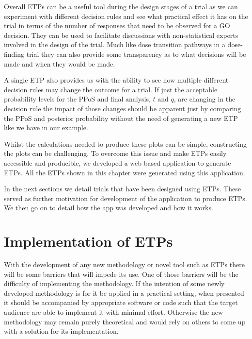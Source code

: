Overall ETPs can be a useful tool during the design stages of a trial as we can experiment with different decision rules and see what practical effect it has on the trial in terms of the number of responses that need to be observed for a GO decision. They can be used to facilitate discussions with non-statistical experts involved in the design of the trial. Much like dose transition pathways in a dose-finding trial they can also provide some transparency as to what decisions will be made and when they would be made. 

A single ETP also provides us with the ability to see how multiple different decision rules may change the outcome for a trial. If just the acceptable probability levels for the PPoS and final analysis, $t$ and $q$, are changing in the decision rule the impact of those changes should be apparent just by comparing the PPoS and posterior probability without the need of generating a new ETP like we have in our example.

Whilst the calculations needed to produce these plots can be simple, constructing the plots can be challenging. To overcome this issue and make ETPs easily accessible and producible, we developed a web based application to generate ETPs. All the ETPs shown in this chapter were generated using this application. 

In the next sections we detail trials that have been designed using ETPs. These served as further motivation for development of the application to produce ETPs. We then go on to detail how the app was developed and how it works.    


\section{Implementation of ETPs}

With the development of any new methodology or novel tool such as ETPs there will be some barriers that will impede its use. One of those barriers will be the difficulty of implementing the methodology. If the intention of some newly developed methodology is for it be applied in a practical setting, when presented it should be accompanied by appropriate software or code such that the target audience are able to implement it with minimal effort. Otherwise the new methodology may remain purely theoretical and would rely on others to come up with a solution for its implementation. 


